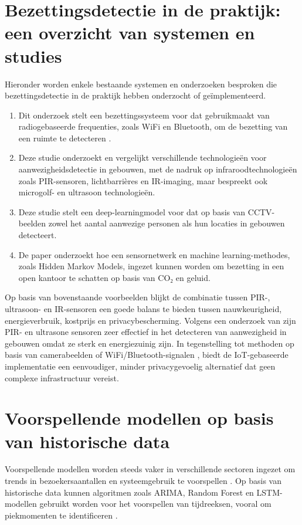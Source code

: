 \section{Bezettingsdetectie in de praktijk: een overzicht van systemen en studies}
Hieronder worden enkele bestaande systemen en onderzoeken besproken die bezettingsdetectie in de praktijk hebben onderzocht of geïmplementeerd.

\begin{enumerate}
    \item Dit onderzoek stelt een bezettingssysteem voor dat gebruikmaakt van radiogebaseerde frequenties, zoals WiFi en Bluetooth, om de bezetting van een ruimte te detecteren \autocite{Shahbazian2023}.
    
    \item Deze studie onderzoekt en vergelijkt verschillende technologieën voor aanwezigheidsdetectie in gebouwen, met de nadruk op infraroodtechnologieën zoals PIR-sensoren, lichtbarrières en IR-imaging, maar bespreekt ook microgolf- en ultrasoon technologieën. \autocite{Maaspuro2018}
    
    \item Deze studie stelt een deep-learningmodel voor dat op basis van CCTV-beelden zowel het aantal aanwezige personen als hun locaties in gebouwen detecteert. \autocite{Hu2023}
    
    \item De paper onderzoekt hoe een sensornetwerk en machine learning-methodes, zoals Hidden Markov Models, ingezet kunnen worden om bezetting in een open kantoor te schatten op basis van CO₂ en geluid. \autocite{Lam2009}
\end{enumerate}

Op basis van bovenstaande voorbeelden blijkt de combinatie tussen PIR-, ultrasoon- en IR-sensoren een goede balans te bieden tussen nauwkeurigheid, energieverbruik, kostprijs en privacybescherming. Volgens een onderzoek van \autocite{Maaspuro2018} zijn PIR- en ultrasone sensoren zeer effectief in het detecteren van aanwezigheid in gebouwen omdat ze sterk en energiezuinig zijn. In tegenstelling tot methoden op basis van camerabeelden of WiFi/Bluetooth-signalen \autocite{Hu2023, Shahbazian2023}, biedt de IoT-gebaseerde implementatie een eenvoudiger, minder privacygevoelig alternatief dat geen complexe infrastructuur vereist.

\section{Voorspellende modellen op basis van historische data}
Voorspellende modellen worden steeds vaker in verschillende sectoren ingezet om trends in bezoekersaantallen en systeemgebruik te voorspellen \autocite{Ejstrud2006}. Op basis van historische data kunnen algoritmen zoals ARIMA, Random Forest en LSTM-modellen gebruikt worden voor het voorspellen van tijdreeksen, vooral om piekmomenten te identificeren \autocite{Park_2024}. 

